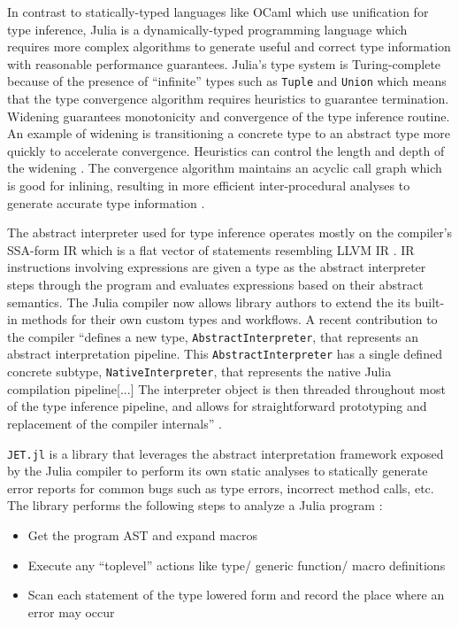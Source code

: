 \documentclass[manuscript, nonacm]{acmart}
\begin{document}
In contrast to statically-typed languages like OCaml which use unification for type inference, Julia is a dynamically-typed programming language which requires more complex algorithms to generate useful and correct type information with reasonable performance guarantees. Julia's type system is Turing-complete because of the presence of ``infinite'' types such as \texttt{Tuple} and \texttt{Union} which means that the type convergence algorithm requires heuristics to guarantee termination. Widening guarantees monotonicity and convergence of the type inference routine. An example of widening is transitioning a concrete type to an abstract type more quickly to accelerate convergence. Heuristics can control the length and depth of the widening \cite{Kadowaki21}. The convergence algorithm maintains an acyclic call graph which is good for inlining, resulting in more efficient inter-procedural analyses to generate accurate type information \cite{jameson}.

The abstract interpreter used for type inference operates mostly on the compiler's SSA-form IR which is a flat vector of statements resembling LLVM IR \cite{julia-ssa}. IR instructions involving expressions are given a type as the abstract interpreter steps through the program and evaluates expressions based on their abstract semantics. The Julia compiler now allows library authors to extend the its built-in methods for their own custom types and workflows. A recent contribution to the compiler ``defines a new type, \texttt{AbstractInterpreter}, that represents an abstract interpretation pipeline. This \texttt{AbstractInterpreter} has a single defined concrete subtype, \texttt{NativeInterpreter}, that represents the native Julia compilation pipeline[...] The interpreter object is then threaded throughout most of the type inference pipeline, and allows for straightforward prototyping and replacement of the compiler internals'' \cite{abstract-interpretation-pr}.

\texttt{JET.jl} is a library that leverages the abstract interpretation framework exposed by the Julia compiler to perform its own static analyses to statically generate error reports for common bugs such as type errors, incorrect method calls, etc. The library performs the following steps to analyze a Julia program \cite{Kadowaki21}:
\begin{itemize}
    \item Get the program AST and expand macros
    \item Execute any ``toplevel'' actions like type/ generic function/ macro definitions
    \item Scan each statement of the type lowered form and record the place where an error may occur
\end{itemize}
\end{document}

